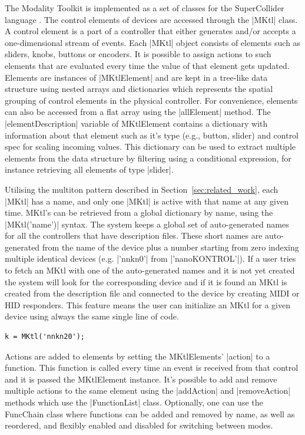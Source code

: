 \documentclass{article}
\begin{document}
The Modality Toolkit is implemented as a set of classes for the SuperCollider language \cite{mccartney2002-ret}. 
The control elements of devices are accessed through the |MKtl| class. 
A control element is a part of a controller that either generates and/or accepts a one-dimensional stream of events. 
Each |MKtl| object consists of elements such as sliders, knobs, buttons or encoders.
It is possible to assign actions to such elements that are evaluated every time the value of that element gets updated.
Elements are instances of |MKtlElement| and are kept in a tree-like data structure using nested arrays and dictionaries which represents the spatial grouping of control elements in the physical controller. 
For convenience, elements can also be accessed from a flat array using the |allElement| method. 
The |elementDescription| variable of MKtlElement contains a dictionary with information about that element such as it's type (e.g., button, slider) and control spec for scaling incoming values. 
This dictionary can be used to extract multiple elements from the data structure by filtering using a conditional expression, for instance retrieving all elements of type |slider|.

Utilising the multiton pattern described in Section~\ref{sec:related_work}, each |MKtl| has a name, and only one |MKtl| is active with that name at any given time. 
MKtl's can be retrieved from a global dictionary by name, using the |MKtl('name')| syntax. 
The system keeps a global set of auto-generated names for all the controllers that have description files. These short names are auto-generated from the name of the device plus a number starting from zero indexing multiple identical devices (e.g. |'nnkn0'| from |'nanoKONTROL'|). If a user tries to fetch an MKtl with one of the auto-generated names and it is not yet created the system will look for the corresponding device and if it is found an MKtl is created from the description file and connected to the device by creating MIDI or HID responders. This feature means the user can initialize an MKtl for a given device using always the same single line of code.

\begin{Verbatim}
k = MKtl('nnkn20');
\end{Verbatim}

Actions are added to elements by setting the MKtlElements' |action| to a function. This function is called every time an event is received from that control and it is passed the MKtlElement instance. It's possible to add and remove multiple actions to the same element using the |addAction| and |removeAction| methods which use the |FunctionList| class. Optionally, one can use the FuncChain class where functions can be added and removed by name, as well as reordered, and flexibly enabled and disabled for switching between modes. 
\end{document}
